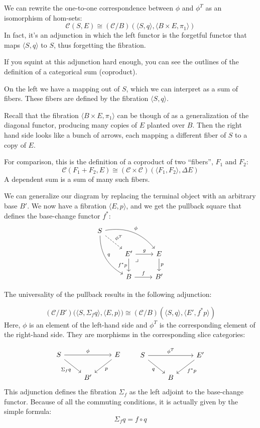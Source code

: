 \documentclass[DaoFP]{subfiles}
\begin{document}
 We can rewrite the one-to-one correspondence between $\phi$ and $\phi^T$ as an isomorphism of hom-sets:
\[ \mathcal{C}(S, E) \cong  (\mathcal{C}/B)(\langle S, q \rangle, \langle B \times E, \pi_1 \rangle)\]
In fact, it's an adjunction in which the left functor is the forgetful functor that maps $\langle S, q \rangle$ to $S$, thus forgetting the fibration.

If you squint at this adjunction hard enough, you can see the outlines of the definition of a categorical sum (coproduct). 

On the left we have a mapping out of $S$, which we can interpret as a sum of fibers. These fibers are defined by the fibration $\langle S, q \rangle$. 

Recall that the fibration $\langle B \times E, \pi_1 \rangle$ can be though of as a generalization of the diagonal functor, producing many copies of $E$ planted over $B$. Then the right hand side looks like a bunch of arrows, each mapping a different fiber of $S$ to a copy of $E$. 

For comparison, this is the definition of a coproduct of two ``fibers'', $F_1$ and $F_2$:
\[ \mathcal{C}(F_1 + F_2, E) \cong (\mathcal{C} \times \mathcal{C}) (\langle F_1, F_2 \rangle, \Delta E) \]
A dependent sum is a sum of many such fibers.

We can generalize our diagram by replacing the terminal object with an arbitrary base $B'$. We now have a fibration $\langle E, p \rangle$, and we get the pullback square that defines the base-change functor $f^*$:
\[
 \begin{tikzcd}
 S
 \arrow[dr, dashed, "\phi^T"]
 \arrow[drr, bend left, "\phi"]
 \arrow[ddr, bend right, "q"]
 \\
 &E'
\arrow[dr, phantom,  , very near start, "\lrcorner"]
 \arrow[r, "g"]
 \arrow[d, "f^* p"']
 &E
 \arrow[d, "p"]
 \\
 &B
 \arrow[r, "f"]
 &B'
  \end{tikzcd}
\]

The universality of the pullback results in the following adjunction:

\[ (\mathcal{C}/B') \big(\langle S, \Sigma_f q\rangle , \langle E, p\rangle \big)  \cong   (\mathcal{C}/B) (\langle S, q \rangle , \langle E', f^* p\rangle )\]
Here, $\phi$ is an element of the left-hand side and $\phi^T$ is the corresponding element of the right-hand side. They are morphisms in the corresponding slice categories:

\[
\begin{tikzcd}
 S
 \arrow[rr, "\phi"]
 \arrow[rd, "\Sigma_f q"']
 &&E
 \arrow[dl, "p"]
 \\
 &B'
 \end{tikzcd}
\hspace{20pt}
 \begin{tikzcd}
 S
 \arrow[rr, "\phi^T"]
 \arrow[rd, "q"']
 && E'
 \arrow[ld, "f^* p"]
 \\
 & B
  \end{tikzcd}
 \]
This adjunction defines the fibration $\Sigma_f$ as the left adjoint to the base-change functor. Because of all the commuting conditions, it is actually given by the simple formula:
 \[ \Sigma_f q = f \circ q \]
\end{document}
